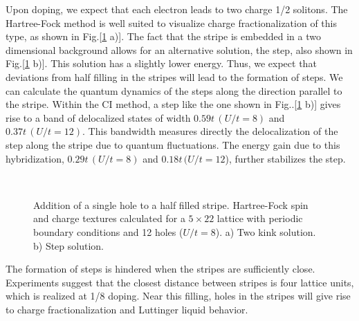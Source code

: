 Upon doping, we expect that each electron
leads to two charge 1/2 solitons\cite{G93}. The Hartree-Fock method is well
suited to visualize charge fractionalization of this type\cite{HKSS88},
as shown in Fig.[\ref{fig:solitons} a)]. The fact that the stripe
is embedded in a two dimensional background allows for an
alternative solution, the step\cite{BSZ00}, also shown in
Fig.[\ref{fig:solitons} b)]. This solution has a slightly lower
energy. Thus, we expect that deviations from half filling
in the stripes will lead to the formation of steps. 
We can calculate the quantum dynamics of the steps along the
direction parallel to the stripe. Within the CI method, a step
like the one shown in Fig..[\ref{fig:solitons} b)] gives rise to
a band of delocalized states of width $0.59 t \, ( U/t = 8)$
and $0.37 t \, ( U/t = 12)$. This bandwidth measures directly
the delocalization of the step along the stripe due to quantum
fluctuations. The 
energy gain due to this hybridization, $0.29 t \, ( U/t = 8 )$ and
$0.18 t \, ( U/t = 12$),   further stabilizes
the step.  
\begin{figure}
\begin{center}
\mbox{\epsfxsize 10cm }
\end{center}
\caption{
Addition of a single hole to a half filled stripe. Hartree-Fock spin and
charge textures calculated for a $5 \times 22$ 
lattice with periodic boundary conditions and 12 holes
($U/t = 8$). a) Two kink solution. b) Step solution.}
\label{fig:solitons}
\end{figure}
The formation of steps is hindered when the stripes are sufficiently close.
Experiments suggest that the closest distance between stripes is four
lattice units, which is realized at 1/8 doping\cite{Zetal99}.
Near this filling, holes in the stripes will give rise to charge
fractionalization and Luttinger liquid behavior\cite{CG98,CCR99}.
   
